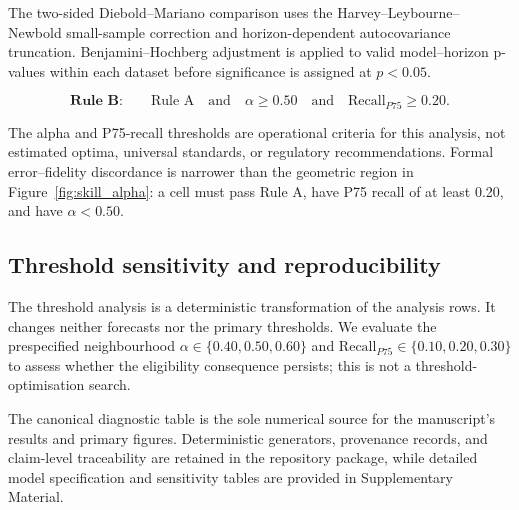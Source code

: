 The two-sided Diebold--Mariano comparison uses the
Harvey--Leybourne--Newbold small-sample correction and horizon-dependent
autocovariance truncation. Benjamini--Hochberg adjustment is applied to
valid model--horizon p-values within each dataset before significance is
assigned at $p<0.05$.

\begin{equation}
\textbf{Rule B:}\qquad \text{Rule A}\quad\text{and}\quad
\alpha\geq0.50\quad\text{and}\quad \mathrm{Recall}_{P75}\geq0.20.
\label{eq:rule-b}
\end{equation}

The alpha and P75-recall thresholds are operational criteria for this
analysis, not estimated optima, universal standards, or regulatory
recommendations. Formal error--fidelity discordance is narrower than the
geometric region in Figure~\ref{fig:skill_alpha}: a cell must pass Rule A,
have P75 recall of at least 0.20, and have $\alpha<0.50$.

\subsection{Threshold sensitivity and reproducibility}

The threshold analysis is a deterministic transformation of the analysis
rows. It changes neither forecasts nor the primary thresholds. We evaluate
the prespecified neighbourhood $\alpha\in\{0.40,0.50,0.60\}$ and
$\mathrm{Recall}_{P75}\in\{0.10,0.20,0.30\}$ to assess whether the
eligibility consequence persists; this is not a threshold-optimisation
search.

The canonical diagnostic table is the sole numerical source for the
manuscript's results and primary figures. Deterministic generators,
provenance records, and claim-level traceability are retained in the
repository package, while detailed model specification and sensitivity
tables are provided in Supplementary Material.
